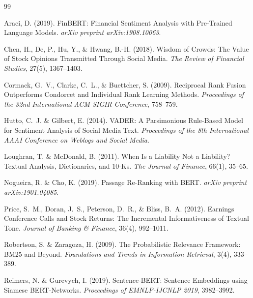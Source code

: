 \documentclass[12pt,a4paper]{article}
\begin{document}

\begin{thebibliography}{99}

Araci, D. (2019).
\newblock FinBERT: Financial Sentiment Analysis with Pre-Trained Language Models.
\newblock \emph{arXiv preprint arXiv:1908.10063}.

Chen, H., De, P., Hu, Y., \& Hwang, B.-H. (2018).
\newblock Wisdom of Crowds: The Value of Stock Opinions Transmitted Through Social Media.
\newblock \emph{The Review of Financial Studies}, 27(5), 1367--1403.

Cormack, G.~V., Clarke, C.~L., \& Buettcher, S. (2009).
\newblock Reciprocal Rank Fusion Outperforms Condorcet and Individual Rank Learning Methods.
\newblock \emph{Proceedings of the 32nd International ACM SIGIR Conference}, 758--759.

Hutto, C.~J. \& Gilbert, E. (2014).
\newblock VADER: A Parsimonious Rule-Based Model for Sentiment Analysis of Social Media Text.
\newblock \emph{Proceedings of the 8th International AAAI Conference on Weblogs and Social Media}.

Loughran, T. \& McDonald, B. (2011).
\newblock When Is a Liability Not a Liability? Textual Analysis, Dictionaries, and 10-Ks.
\newblock \emph{The Journal of Finance}, 66(1), 35--65.

Nogueira, R. \& Cho, K. (2019).
\newblock Passage Re-Ranking with BERT.
\newblock \emph{arXiv preprint arXiv:1901.04085}.

Price, S.~M., Doran, J.~S., Peterson, D.~R., \& Bliss, B.~A. (2012).
\newblock Earnings Conference Calls and Stock Returns: The Incremental Informativeness of Textual Tone.
\newblock \emph{Journal of Banking \& Finance}, 36(4), 992--1011.

Robertson, S. \& Zaragoza, H. (2009).
\newblock The Probabilistic Relevance Framework: BM25 and Beyond.
\newblock \emph{Foundations and Trends in Information Retrieval}, 3(4), 333--389.

Reimers, N. \& Gurevych, I. (2019).
\newblock Sentence-BERT: Sentence Embeddings using Siamese BERT-Networks.
\newblock \emph{Proceedings of EMNLP-IJCNLP 2019}, 3982--3992.


\end{thebibliography}
\end{document}

